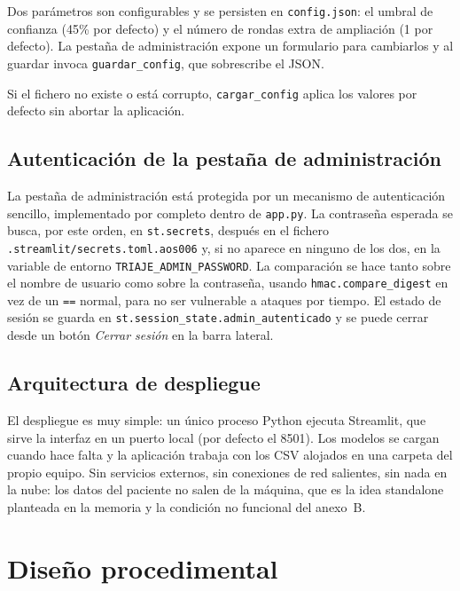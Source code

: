 Dos parámetros son configurables y se persisten en \texttt{config.json}: el umbral de confianza (45\% por defecto) y el número de rondas extra de ampliación (1 por defecto). La pestaña de administración expone un formulario para cambiarlos y al guardar invoca \texttt{guardar\_config}, que sobrescribe el JSON.

Si el fichero no existe o está corrupto, \texttt{cargar\_config} aplica los valores por defecto sin abortar la aplicación. 



\subsection*{Autenticación de la pestaña de administración}

La pestaña de administración está protegida por un mecanismo de autenticación sencillo, implementado por completo dentro de \texttt{app.py}. La contraseña esperada se busca, por este orden, en \texttt{st.secrets}, después en el fichero \texttt{.streamlit/secrets.toml.aos006} y, si no aparece en ninguno de los dos, en la variable de entorno \texttt{TRIAJE\_ADMIN\_PASSWORD}. La comparación se hace tanto sobre el nombre de usuario como sobre la contraseña, usando \texttt{hmac.compare\_digest} en vez de un \texttt{==} normal, para no ser vulnerable a ataques por tiempo. El estado de sesión se guarda en \texttt{st.session\_state.admin\_autenticado} y se puede cerrar desde un botón \textit{Cerrar sesión} en la barra lateral.

\subsection*{Arquitectura de despliegue}

El despliegue es muy simple: un único proceso Python ejecuta Streamlit, que sirve la interfaz en un puerto local (por defecto el 8501). Los modelos se cargan cuando hace falta y la aplicación trabaja con los CSV alojados en una carpeta del propio equipo. Sin servicios externos, sin conexiones de red salientes, sin nada en la nube: los datos del paciente no salen de la máquina, que es la idea \gls{standalone} planteada en la memoria y la condición no funcional del anexo~B.




\section{Diseño procedimental}

